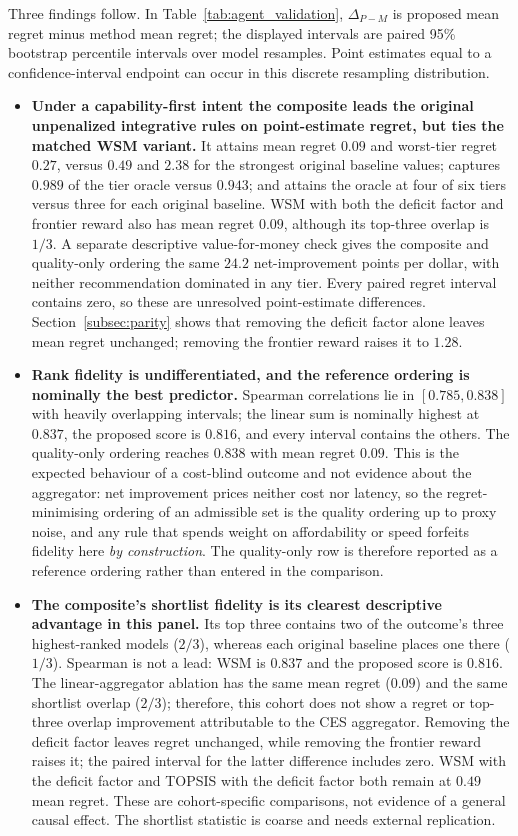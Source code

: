 \documentclass[pdflatex,sn-mathphys-num]{sn-jnl}
\theoremstyle{thmstyleone}
\theoremstyle{thmstylethree}
\begin{document}
Three findings follow. In Table~\ref{tab:agent_validation}, $\Delta_{P-M}$ is proposed mean regret minus method mean regret; the displayed intervals are paired 95\% bootstrap percentile intervals over model resamples. Point estimates equal to a confidence-interval endpoint can occur in this discrete resampling distribution.
\begin{itemize}
  \item \textbf{Under a capability-first intent the composite leads the original unpenalized integrative rules on point-estimate regret, but ties the matched WSM variant.} It attains mean regret $0.09$ and worst-tier regret $0.27$, versus $0.49$ and $2.38$ for the strongest original baseline values; captures $0.989$ of the tier oracle versus $0.943$; and attains the oracle at four of six tiers versus three for each original baseline. WSM with both the deficit factor and frontier reward also has mean regret $0.09$, although its top-three overlap is $1/3$. A separate descriptive value-for-money check gives the composite and quality-only ordering the same $24.2$ net-improvement points per dollar, with neither recommendation dominated in any tier. Every paired regret interval contains zero, so these are unresolved point-estimate differences. Section~\ref{subsec:parity} shows that removing the deficit factor alone leaves mean regret unchanged; removing the frontier reward raises it to $1.28$.
  \item \textbf{Rank fidelity is undifferentiated, and the reference ordering is nominally the best predictor.} Spearman correlations lie in $[0.785,0.838]$ with heavily overlapping intervals; the linear sum is nominally highest at $0.837$, the proposed score is $0.816$, and every interval contains the others. The quality-only ordering reaches $0.838$ with mean regret $0.09$. This is the expected behaviour of a cost-blind outcome and not evidence about the aggregator: net improvement prices neither cost nor latency, so the regret-minimising ordering of an admissible set is the quality ordering up to proxy noise, and any rule that spends weight on affordability or speed forfeits fidelity here \emph{by construction}. The quality-only row is therefore reported as a reference ordering rather than entered in the comparison.
  \item \textbf{The composite's shortlist fidelity is its clearest descriptive advantage in this panel.} Its top three contains two of the outcome's three highest-ranked models ($2/3$), whereas each original baseline places one there ($1/3$). Spearman is not a lead: WSM is $0.837$ and the proposed score is $0.816$. The linear-aggregator ablation has the same mean regret ($0.09$) and the same shortlist overlap ($2/3$); therefore, this cohort does not show a regret or top-three overlap improvement attributable to the CES aggregator. Removing the deficit factor leaves regret unchanged, while removing the frontier reward raises it; the paired interval for the latter difference includes zero. WSM with the deficit factor and TOPSIS with the deficit factor both remain at $0.49$ mean regret. These are cohort-specific comparisons, not evidence of a general causal effect. The shortlist statistic is coarse and needs external replication.
\end{itemize}
\end{document}
